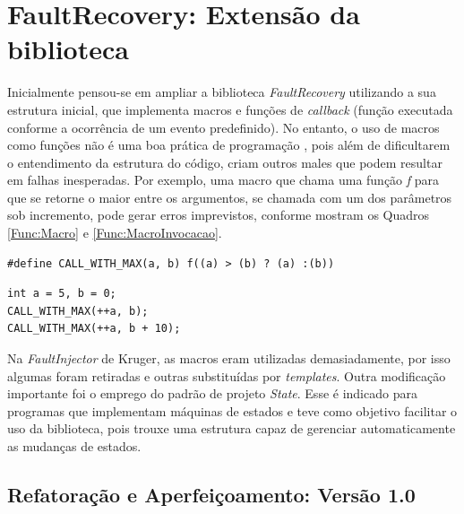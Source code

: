 \section{FaultRecovery: Extensão da biblioteca} \label{sec:extensaoBiblioteca}

Inicialmente pensou-se em ampliar a biblioteca \textit{FaultRecovery} utilizando a sua estrutura inicial, que implementa macros e funções de \textit{callback} (função executada conforme a ocorrência de um evento predefinido). No entanto, o uso de macros como funções não é uma boa prática de programação \cite{Meyers:2011}, pois além de dificultarem o entendimento da estrutura do código, criam outros males que podem resultar em falhas inesperadas. Por exemplo, uma macro que chama uma função \textit{f} para que se retorne o maior entre os argumentos, se chamada com um dos parâmetros sob incremento, pode gerar erros imprevistos, conforme mostram os Quadros \ref{Func:Macro} e \ref{Func:MacroInvocacao}.

\begin{lstlisting}[label=Func:Macro,caption={[Uso de macro como função] Macro que chama \textit{f} como o máximo entre a e b}]
#define CALL_WITH_MAX(a, b) f((a) > (b) ? (a) :(b))
\end{lstlisting}

\begin{lstlisting}[label=Func:MacroInvocacao,caption={[Macro sendo chamada no código] Na primeira invocação da macro a variável a é incrementada duas vezes e na segunda uma vez.}]
int a = 5, b = 0;
CALL_WITH_MAX(++a, b);
CALL_WITH_MAX(++a, b + 10);
\end{lstlisting}


Na \textit{FaultInjector} de Kruger, as macros eram utilizadas demasiadamente, por isso algumas foram retiradas e outras substituídas por \textit{templates}. Outra modificação importante foi o emprego do padrão de projeto \textit{State}. Esse é indicado para programas que implementam máquinas de estados e teve como objetivo facilitar o uso da biblioteca, pois trouxe uma estrutura capaz de gerenciar automaticamente as mudanças de estados.

\subsection{Refatoração e Aperfeiçoamento: Versão 1.0} \label{subsec:versao1}

